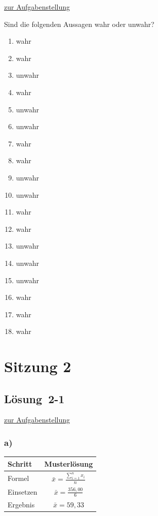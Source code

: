 \documentclass[
  11pt,
  ngerman,
  a4paper,
]{report}
\providecommand{\tightlist}{%
  \setlength{\itemsep}{0pt}\setlength{\parskip}{0pt}}
\begin{document}
\protect\hyperlink{aufgabe-1-5}{zur Aufgabenstellung}

Sind die folgenden Aussagen wahr oder unwahr?

\begin{enumerate}
\def\labelenumi{\alph{enumi})}
\tightlist
\item
  wahr
\item
  wahr
\item
  unwahr
\item
  wahr
\item
  unwahr
\item
  unwahr
\item
  wahr
\item
  wahr
\item
  unwahr
\item
  unwahr
\item
  wahr
\item
  wahr
\item
  unwahr
\item
  unwahr
\item
  unwahr
\item
  wahr
\item
  wahr
\item
  wahr
\end{enumerate}

\hypertarget{sitzung-2}{%
\section*{Sitzung 2}\label{sitzung-2}}

\hypertarget{loesung-2-1}{%
\subsection{Lösung~2-1}\label{loesung-2-1}}

\protect\hyperlink{aufgabe-2-1}{zur Aufgabenstellung}

\hypertarget{a-2}{%
\subsubsection{a)}\label{a-2}}

\begin{table}[H]
\centering
\begin{tabular}{lc}
\toprule
Schritt & Musterlösung\\
\midrule
Formel & $\bar{x}=\frac{\sum\limits_{i=1}^{n}x_{i}}{n}$\\
Einsetzen & $\bar{x}=\frac{356{,}00}{6}$\\
Ergebnis & $\bar{x}=59{,}33$\\
\bottomrule
\end{tabular}
\end{table}
\end{document}
